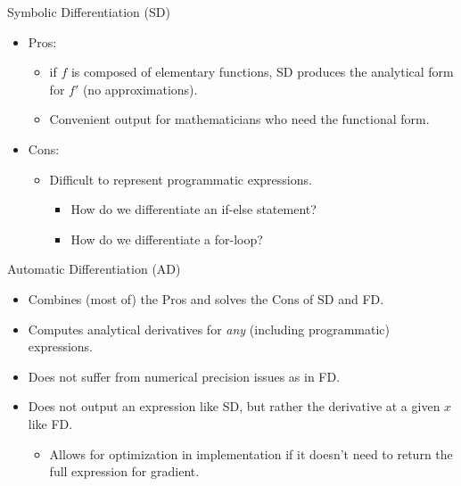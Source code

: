\begin{frame}{Symbolic Differentiation (SD)}
\begin{itemize}
    \item Pros:
    \begin{itemize}
        \item if $f$ is composed of elementary functions,
            SD produces the analytical form for $f'$ (no approximations).
        \item Convenient output for mathematicians who need the functional form.
    \end{itemize}
    \item Cons:
    \begin{itemize}
        \item Difficult to represent programmatic expressions.
        \begin{itemize}
            \item How do we differentiate an if-else statement?
            \item How do we differentiate a for-loop?
        \end{itemize}
    \end{itemize}
\end{itemize}
\end{frame}

\begin{frame}{Automatic Differentiation (AD)}
\begin{itemize}
    \item Combines (most of) the Pros and solves the Cons of SD and FD.
    \item Computes analytical derivatives for \emph{any} (including programmatic) expressions.
    \item Does not suffer from numerical precision issues as in FD.
    \item Does not output an expression like SD, but rather the derivative at a given $x$
    like FD.
    \begin{itemize}
        \item Allows for optimization in implementation if it doesn't need to return 
        the full expression for gradient.
    \end{itemize}
\end{itemize}
\end{frame}
